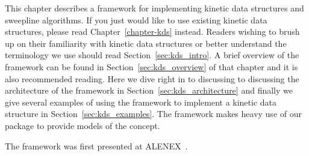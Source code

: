 

%

\minitoc



\def\note#1{$\langle\langle${\bf #1}$\rangle\rangle$}

%

This chapter describes a framework for implementing kinetic data
structures and sweepline algorithms. If you just would like to use
existing kinetic data structures, please read
Chapter~\ref{chapter-kds} instead. Readers wishing to brush up on
their familiarity with kinetic data structures or better understand
the terminology we use should read Section~\ref{sec:kds_intro}.  A brief
overview of the framework can be found in
Section~\ref{sec:kds_overview} of that chapter and it is also
recommended reading. Here we dive right in to discussing to discussing
the architecture of the framework in Section~\ref{sec:kds_architecture}
and finally we give several examples of using the framework to
implement a kinetic data structure in Section~\ref{sec:kds_examples}. The
framework makes heavy use of our  package to
provide models of the  concept.

The framework was first presented at ALENEX~\cite{cgal:gkr-cfhm-04}.







